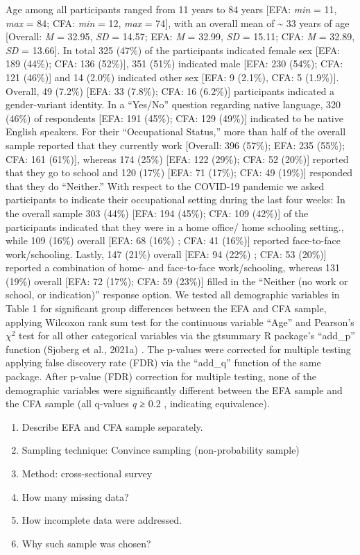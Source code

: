 \documentclass[
  english,
  man]{apa6}
\providecommand{\tightlist}{%
  \setlength{\itemsep}{0pt}\setlength{\parskip}{0pt}}
\begin{document}
Age among all participants ranged from 11 years to 84 years {[}EFA: \emph{min} = 11, \emph{max} = 84; CFA: \emph{min} = 12, \emph{max} = 74{]}, with an overall mean of \textasciitilde{} 33 years of age {[}Overall: \emph{M} = 32.95, \emph{SD} = 14.57; EFA: \emph{M} = 32.99, \emph{SD} = 15.11; CFA: \emph{M} = 32.89, \emph{SD} = 13.66{]}. In total 325 (47\%) of the participants indicated female sex {[}EFA: 189 (44\%); CFA: 136 (52\%){]}, 351 (51\%) indicated male {[}EFA: 230 (54\%); CFA: 121 (46\%){]} and 14 (2.0\%) indicated other sex {[}EFA: 9 (2.1\%), CFA: 5 (1.9\%){]}. Overall, 49 (7.2\%) {[}EFA: 33 (7.8\%); CFA: 16 (6.2\%){]} participants indicated a gender-variant identity. In a ``Yes/No'' question regarding native language, 320 (46\%) of respondents {[}EFA: 191 (45\%); CFA: 129 (49\%){]} indicated to be native English speakers. For their ``Occupational Status,'' more than half of the overall sample reported that they currently work {[}Overall: 396 (57\%); EFA: 235 (55\%); CFA: 161 (61\%){]}, whereas 174 (25\%) {[}EFA: 122 (29\%); CFA: 52 (20\%){]} reported that they go to school and 120 (17\%) {[}EFA: 71 (17\%); CFA: 49 (19\%){]} responded that they do ``Neither.'' With respect to the COVID-19 pandemic we asked participants to indicate their occupational setting during the last four weeks: In the overall sample 303 (44\%) {[}EFA: 194 (45\%); CFA: 109 (42\%){]} of the participants indicated that they were in a home office/ home schooling setting., while 109 (16\%) overall {[}EFA: 68 (16\%) ; CFA: 41 (16\%){]} reported face-to-face work/schooling. Lastly, 147 (21\%) overall {[}EFA: 94 (22\%) ; CFA: 53 (20\%){]} reported a combination of home- and face-to-face work/schooling, whereas 131 (19\%) overall {[}EFA: 72 (17\%); CFA: 59 (23\%){]} filled in the ``Neither (no work or school, or indication)'' response option. We tested all demographic variables in Table 1 for significant group differences between the EFA and CFA sample, applying Wilcoxon rank sum test for the continuous variable ``Age'' and Pearson's \(\chi^2\) test for all other categorical variables via the gtsummary R package's ``add\_p'' function (Sjoberg et al., 2021a) . The p-values were corrected for multiple testing applying false discovery rate (FDR) via the ``add\_q'' function of the same package. After p-value (FDR) correction for multiple testing, none of the demographic variables were significantly different between the EFA sample and the CFA sample (all q-values \emph{q} ≥ 0.2 , indicating equivalence).

\begin{enumerate}
\def\labelenumi{\arabic{enumi}.}
\tightlist
\item
  Describe EFA and CFA sample separately.
\item
  Sampling technique: Convince sampling (non-probability sample)
\item
  Method: cross-sectional survey
\item
  How many missing data?
\item
  How incomplete data were addressed.
\item
  Why such sample was chosen?
\end{enumerate}
\end{document}
